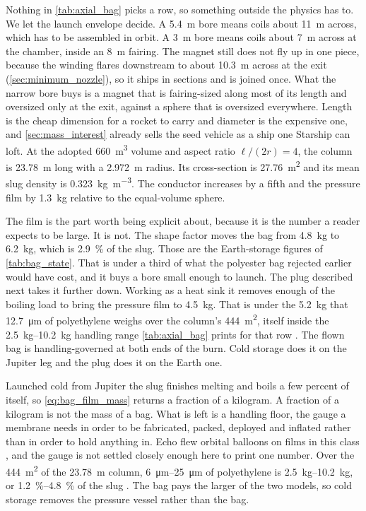 \documentclass{article}
\begin{document}
Nothing in \autoref{tab:axial_bag} picks a row, so something outside the physics has to. We let the launch envelope decide. A \SI{5.4}{\meter} bore means coils about \SI{11}{\meter} across, which has to be assembled in orbit. A \SI{3}{\meter} bore means coils about \SI{7}{\meter} across at the chamber, inside an \SI{8}{\meter} fairing. The magnet still does not fly up in one piece, because the winding flares downstream to about \SI{10.3}{\meter} across at the exit (\autoref{sec:minimum_nozzle}), so it ships in sections and is joined once. What the narrow bore buys is a magnet that is fairing-sized along most of its length and oversized only at the exit, against a sphere that is oversized everywhere. Length is the cheap dimension for a rocket to carry and diameter is the expensive one, and \autoref{sec:mass_interest} already sells the seed vehicle as a ship one Starship can loft. At the adopted \SI{660}{\cubic\meter} volume and aspect ratio $\ell/(2r)=4$, the column is \SI{23.78}{\meter} long with a \SI{2.972}{\meter} radius. Its cross-section is \SI{27.76}{\square\meter} and its mean slug density is \SI{0.323}{\kilogram\per\cubic\meter}. The conductor increases by a fifth and the pressure film by \SI{1.3}{\kilogram} relative to the equal-volume sphere.

The film is the part worth being explicit about, because it is the number a reader expects to be large. It is not. The shape factor moves the bag from \SI{4.8}{\kilogram} to \SI{6.2}{\kilogram}, which is \SI{2.9}{\percent} of the slug. Those are the Earth-storage figures of \autoref{tab:bag_state}. That is under a third of what the polyester bag rejected earlier would have cost, and it buys a bore small enough to launch. The plug described next takes it further down. Working as a heat sink it removes enough of the boiling load to bring the pressure film to \SI{4.5}{\kilogram}. That is under the \SI{5.2}{\kilogram} that \SI{12.7}{\micro\meter} of polyethylene weighs over the column's \SI{444}{\square\meter}, itself inside the \SIrange{2.5}{10.2}{\kilogram} handling range \autoref{tab:axial_bag} prints for that row \cite{Katz_aim_is_all_you_need_2025}. The flown bag is handling-governed at both ends of the burn. Cold storage does it on the Jupiter leg and the plug does it on the Earth one.

Launched cold from Jupiter the slug finishes melting and boils a few percent of itself, so \autoref{eq:bag_film_mass} returns a fraction of a kilogram. A fraction of a kilogram is not the mass of a bag. What is left is a handling floor, the gauge a membrane needs in order to be fabricated, packed, deployed and inflated rather than in order to hold anything in. Echo flew orbital balloons on films in this class \cite{nasa_echo_ii_1966}, and the gauge is not settled closely enough here to print one number. Over the \SI{444}{\square\meter} of the \SI{23.78}{\meter} column, \SIrange{6}{25}{\micro\meter} of polyethylene is \SIrange{2.5}{10.2}{\kilogram}, or \SIrange{1.2}{4.8}{\percent} of the slug \cite{Katz_aim_is_all_you_need_2025}. The bag pays the larger of the two models, so cold storage removes the pressure vessel rather than the bag.
\end{document}
